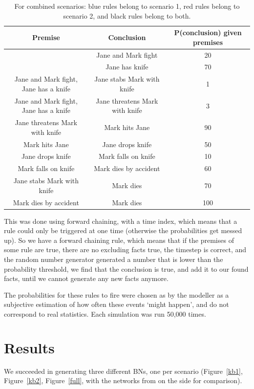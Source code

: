 \begin{table}
\begin{tabular}{|c|c|c|}
 \hline
 Premise & Conclusion & P(conclusion) given premises\\
 \hline
  & Jane and Mark fight   & 20   \\
  & Jane has knife & 70 \\
  \color{blue}Jane and Mark fight, Jane has a knife & Jane stabs Mark with knife & 1 \\
 \color{red}Jane and Mark fight, Jane has a knife & Jane threatens Mark with knife & 3 \\
  \color{red}Jane threatens Mark with knife & Mark hits Jane & 90 \\
  \color{red}Mark hits Jane & Jane drops knife & 50  \\
  \color{red}Jane drops knife & Mark falls on knife & 10 \\
  \color{red} Mark falls on knife & Mark dies by accident & 60  \\
  \color{blue}Jane stabs Mark with knife & Mark dies  & 70 \\ 
  \color{red}Mark dies by accident & Mark dies & 100  \\ 
\hline
\end{tabular}
\caption{For combined scenarios: blue rules belong to scenario 1, red rules belong to scenario 2, and black rules belong to both.}
\end{table}

This was done using forward chaining, with a time index, which means that a rule could only be triggered at one time (otherwise the probabilities get messed up). So we have a forward chaining rule, which means that if the premises of some rule are true, there are no excluding facts true, the timestep is correct, and the random number generator generated a number that is lower than the probability threshold, we find that the conclusion is true, and add it to our found facts, until we cannot generate any new facts anymore.

The probabilities for these rules to fire were chosen as by the modeller as a subjective estimation of how often these events `might happen', and do not correspond to real statistics. Each simulation was run 50,000 times.


\section{Results}
We succeeded in generating three different BNs, one per scenario (Figure~\ref{kb1}, Figure~\ref{kb2}, Figure~\ref{full}, with the networks from \citet{Vlek2015} on the side for comparison).

